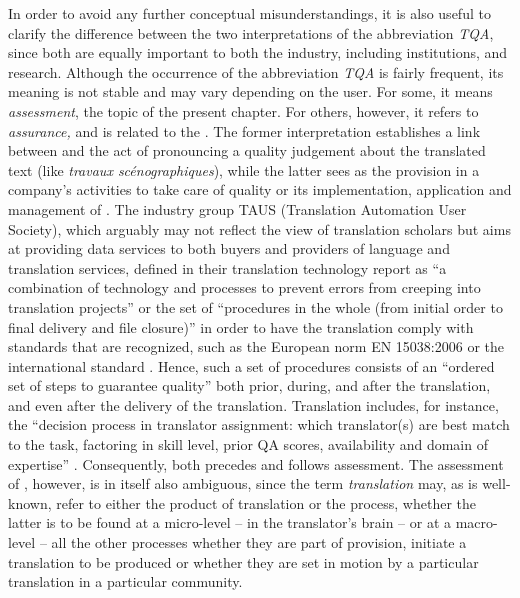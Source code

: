 \documentclass[output=paper]{langsci/langscibook}
\begin{document}
In order to avoid any further conceptual misunderstandings, it is also useful to clarify the difference between the two interpretations of the abbreviation \textit{TQA}, since both are equally important to both the industry, including institutions, and research. Although the occurrence of the abbreviation \textit{TQA} is fairly frequent, its meaning is not stable and may vary depending on the user. For some, it means  \textit{assessment}, the topic of the present chapter. For others, however, it refers to  \textit{assurance,} and is related to the . The former interpretation establishes a link between  and the act of pronouncing a quality judgement about the translated text (like \textit{travaux scénographiques}), while the latter sees  as the provision in a company’s activities to take care of quality or its implementation, application and management of . The industry group TAUS (Translation Automation User Society), which arguably may not reflect the view of translation scholars but aims at providing data services to both buyers and providers of language and translation services, defined  in their translation technology report as “a combination of technology and processes to prevent errors from creeping into translation projects” or the set of ``procedures in the whole  (from initial order to final delivery and file closure)'' \citep[22]{TAUS2013} in order to have the translation comply with standards that are recognized, such as the European norm EN 15038:2006 \nocite{EN2006} or the international standard \citet{ISO2015}. Hence, such a set of procedures consists of an ``ordered set of steps to guarantee quality'' \citep[22]{TAUS2013} both prior, during, and after the translation, and even after the delivery of the translation. Translation  includes, for instance, the ``decision process in translator assignment: which translator(s) are best match to the task, factoring in skill level, prior QA scores, availability and domain of expertise'' \citep[22]{TAUS2013}. Consequently,  both precedes and follows  assessment. The assessment of , however, is in itself also ambiguous, since the term \textit{translation} may, as is well-known, refer to either the product of translation or the process, whether the latter is to be found at a micro-level – in the translator's brain – or at a macro-level – all the other processes whether they are part of  provision, initiate a translation to be produced or whether they are set in motion by a particular translation in a particular community. 
\end{document}
